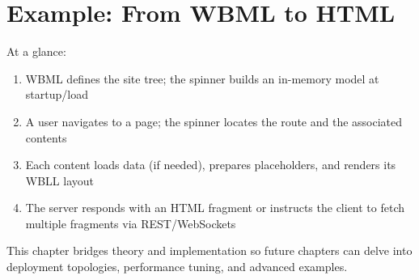 \section{Example: From WBML to HTML}
At a glance:
\begin{enumerate}
  \item WBML defines the site tree; the spinner builds an in-memory model at startup/load
  \item A user navigates to a page; the spinner locates the route and the associated contents
  \item Each content loads data (if needed), prepares placeholders, and renders its WBLL layout
  \item The server responds with an HTML fragment or instructs the client to fetch multiple fragments via REST/WebSockets
\end{enumerate}

\noindent This chapter bridges theory and implementation so future chapters can delve into deployment topologies, performance tuning, and advanced examples.
